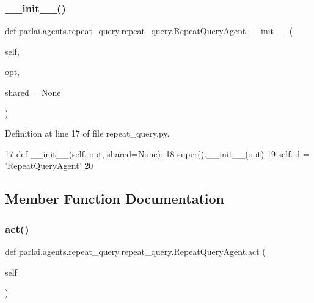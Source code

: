 \subsubsection{\texorpdfstring{\+\_\+\+\_\+init\+\_\+\+\_\+()}{\_\_init\_\_()}}
{\footnotesize\ttfamily def parlai.\+agents.\+repeat\+\_\+query.\+repeat\+\_\+query.\+Repeat\+Query\+Agent.\+\_\+\+\_\+init\+\_\+\+\_\+ (\begin{DoxyParamCaption}\item[{}]{self,  }\item[{}]{opt,  }\item[{}]{shared = {\ttfamily None} }\end{DoxyParamCaption})}



Definition at line 17 of file repeat\+\_\+query.\+py.


\begin{DoxyCode}
17     \textcolor{keyword}{def }\_\_init\_\_(self, opt, shared=None):
18         super().\_\_init\_\_(opt)
19         self.id = \textcolor{stringliteral}{'RepeatQueryAgent'}
20 
\end{DoxyCode}


\subsection{Member Function Documentation}
\mbox{\label{classparlai_1_1agents_1_1repeat__query_1_1repeat__query_1_1RepeatQueryAgent_a7db5db4eda3e033a9022a4f4fe74419b}} 
\subsubsection{\texorpdfstring{act()}{act()}}
{\footnotesize\ttfamily def parlai.\+agents.\+repeat\+\_\+query.\+repeat\+\_\+query.\+Repeat\+Query\+Agent.\+act (\begin{DoxyParamCaption}\item[{}]{self }\end{DoxyParamCaption})}



